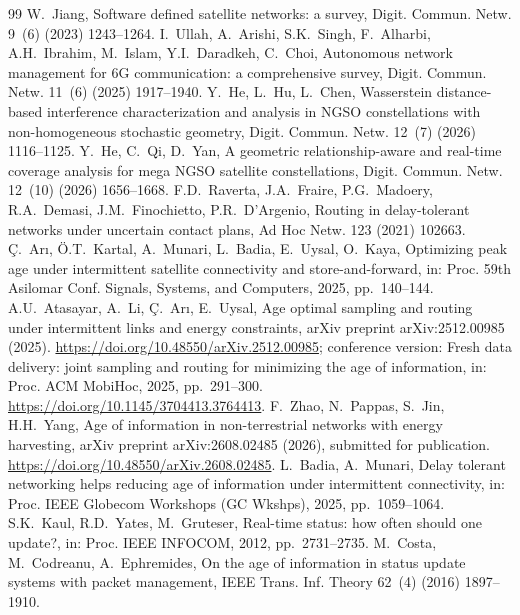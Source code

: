 \documentclass[twocolumn,3p,times,procedia]{elsarticle}
\theoremstyle{plain}
\theoremstyle{remark}
\begin{document}
\balance
\begin{thebibliography}{99}
W.~Jiang, Software defined satellite networks: a survey, Digit. Commun. Netw. 9~(6) (2023) 1243--1264.
I.~Ullah, A.~Arishi, S.K.~Singh, F.~Alharbi, A.H.~Ibrahim, M.~Islam, Y.I.~Daradkeh, C.~Choi, Autonomous network management for 6G communication: a comprehensive survey, Digit. Commun. Netw. 11~(6) (2025) 1917--1940.
Y.~He, L.~Hu, L.~Chen, Wasserstein distance-based interference characterization and analysis in NGSO constellations with non-homogeneous stochastic geometry, Digit. Commun. Netw. 12~(7) (2026) 1116--1125.
Y.~He, C.~Qi, D.~Yan, A geometric relationship-aware and real-time coverage analysis for mega NGSO satellite constellations, Digit. Commun. Netw. 12~(10) (2026) 1656--1668.
F.D.~Raverta, J.A.~Fraire, P.G.~Madoery, R.A.~Demasi, J.M.~Finochietto, P.R.~D'Argenio, Routing in delay-tolerant networks under uncertain contact plans, Ad Hoc Netw. 123 (2021) 102663.
{\c C}.~Ar{\i}, \"O.T.~Kartal, A.~Munari, L.~Badia, E.~Uysal, O.~Kaya, Optimizing peak age under intermittent satellite connectivity and store-and-forward, in: Proc. 59th Asilomar Conf. Signals, Systems, and Computers, 2025, pp.~140--144.
A.U.~Atasayar, A.~Li, {\c C}.~Ar{\i}, E.~Uysal, Age optimal sampling and routing under intermittent links and energy constraints, arXiv preprint arXiv:2512.00985 (2025). \url{https://doi.org/10.48550/arXiv.2512.00985}; conference version: Fresh data delivery: joint sampling and routing for minimizing the age of information, in: Proc. ACM MobiHoc, 2025, pp.~291--300. \url{https://doi.org/10.1145/3704413.3764413}.
F.~Zhao, N.~Pappas, S.~Jin, H.H.~Yang, Age of information in non-terrestrial networks with energy harvesting, arXiv preprint arXiv:2608.02485 (2026), submitted for publication. \url{https://doi.org/10.48550/arXiv.2608.02485}.
L.~Badia, A.~Munari, Delay tolerant networking helps reducing age of information under intermittent connectivity, in: Proc. IEEE Globecom Workshops (GC Wkshps), 2025, pp.~1059--1064.
S.K.~Kaul, R.D.~Yates, M.~Gruteser, Real-time status: how often should one update?, in: Proc. IEEE INFOCOM, 2012, pp.~2731--2735.
M.~Costa, M.~Codreanu, A.~Ephremides, On the age of information in status update systems with packet management, IEEE Trans. Inf. Theory 62~(4) (2016) 1897--1910.

\end{thebibliography}
\end{document}
